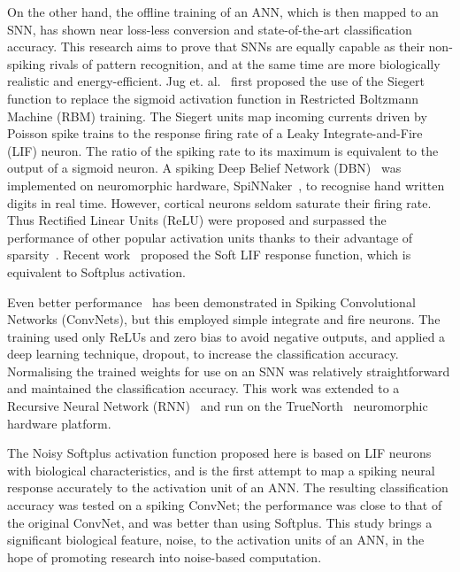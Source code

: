 \documentclass[runningheads,a4paper]{llncs}
\begin{document}
	
	On the other hand, the offline training of an ANN, which is then mapped to an SNN, has shown near loss-less conversion and state-of-the-art classification accuracy.
	This research aims to prove that SNNs are equally capable as their non-spiking rivals of pattern recognition, and at the same time are more biologically realistic and energy-efficient.
	Jug et. al.~\cite{Jug_etal_2012} first proposed the use of the Siegert function to replace the sigmoid activation function in Restricted Boltzmann Machine (RBM) training.
	The Siegert units map incoming currents driven by Poisson spike trains to the response firing rate of a Leaky Integrate-and-Fire (LIF) neuron.
	The ratio of the spiking rate to its maximum is equivalent to the output of a sigmoid neuron.
	A spiking Deep Belief Network (DBN)~\cite{Stromatias2015scalable} was implemented on neuromorphic hardware, SpiNNaker~\cite{furber2014spinnaker}, to recognise hand written digits in real time.
	However, cortical neurons seldom saturate their firing rate.
	Thus Rectified Linear Units (ReLU) were proposed and surpassed the performance of other popular activation units thanks to their advantage of sparsity~\cite{glorot2011deep}.
	Recent work~\cite{hunsberger2015spiking} proposed the Soft LIF response function, which is equivalent to Softplus activation.
	
	Even better performance~\cite{cao2015spiking,diehl2015fast} has been demonstrated in Spiking Convolutional Networks (ConvNets), but this employed simple integrate and fire neurons.
	The training used only ReLUs and zero bias to avoid negative outputs, and applied a deep learning technique, dropout, to increase the classification accuracy.
	Normalising the trained weights for use on an SNN was relatively straightforward and maintained the classification accuracy.
	This work was extended to a Recursive Neural Network (RNN)~\cite{diehl2016conversion} and run on the TrueNorth~\cite{merolla2014million} neuromorphic hardware platform.
	
	The Noisy Softplus activation function proposed here is based on LIF neurons with biological characteristics, and is the first attempt to map a spiking neural response accurately to the activation unit of an ANN.
	The resulting classification accuracy was tested on a spiking ConvNet; the performance was close to that of the original ConvNet, and was better than using Softplus.
	This study brings a significant biological feature, noise, to the activation units of an ANN, in the hope of promoting research into noise-based computation.
	
\end{document}
